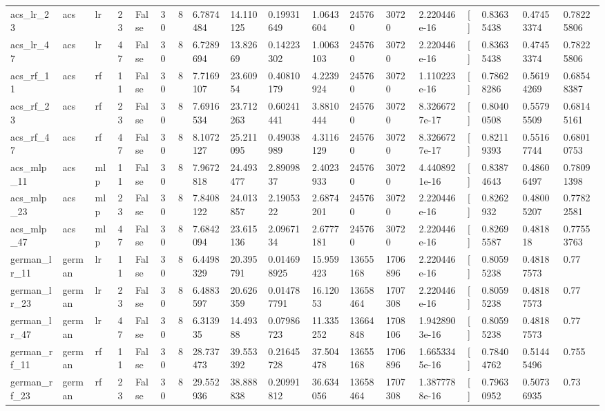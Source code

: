 \begin{tabular}{llllllllllllllllll}
acs\_lr\_23 & acs & lr & 23 & False & 30 & 8 & 6.7874484 & 14.110125 & 0.19931649 & 1.0643604 & 245760 & 30720 & 2.220446e-16 & [] & 0.83635438 & 0.47453374 & 0.78225806 \\
acs\_lr\_47 & acs & lr & 47 & False & 30 & 8 & 6.7289694 & 13.82669 & 0.14223302 & 1.0063103 & 245760 & 30720 & 2.220446e-16 & [] & 0.83635438 & 0.47453374 & 0.78225806 \\
acs\_rf\_11 & acs & rf & 11 & False & 30 & 8 & 7.7169107 & 23.60954 & 0.40810179 & 4.2239924 & 245760 & 30720 & 1.110223e-16 & [] & 0.78628286 & 0.56194269 & 0.68548387 \\
acs\_rf\_23 & acs & rf & 23 & False & 30 & 8 & 7.6916534 & 23.712263 & 0.60241441 & 3.8810444 & 245760 & 30720 & 8.3266727e-17 & [] & 0.80400508 & 0.55795509 & 0.68145161 \\
acs\_rf\_47 & acs & rf & 47 & False & 30 & 8 & 8.1072127 & 25.211095 & 0.49038989 & 4.3116129 & 245760 & 30720 & 8.3266727e-17 & [] & 0.82119393 & 0.55167744 & 0.68010753 \\
acs\_mlp\_11 & acs & mlp & 11 & False & 30 & 8 & 7.9672818 & 24.493477 & 2.8909837 & 2.4023933 & 245760 & 30720 & 4.4408921e-16 & [] & 0.83874643 & 0.48606497 & 0.78091398 \\
acs\_mlp\_23 & acs & mlp & 23 & False & 30 & 8 & 7.8408122 & 24.013857 & 2.1905322 & 2.6874201 & 245760 & 30720 & 2.220446e-16 & [] & 0.8262932 & 0.48005207 & 0.77822581 \\
acs\_mlp\_47 & acs & mlp & 47 & False & 30 & 8 & 7.6842094 & 23.615136 & 2.0967134 & 2.6777181 & 245760 & 30720 & 2.220446e-16 & [] & 0.82695587 & 0.481818 & 0.77553763 \\
german\_lr\_11 & german & lr & 11 & False & 30 & 8 & 6.4498329 & 20.395791 & 0.014698925 & 15.959423 & 13655168 & 1706896 & 2.220446e-16 & [] & 0.80595238 & 0.48187573 & 0.77 \\
german\_lr\_23 & german & lr & 23 & False & 30 & 8 & 6.4883597 & 20.626359 & 0.014787791 & 16.12053 & 13658464 & 1707308 & 2.220446e-16 & [] & 0.80595238 & 0.48187573 & 0.77 \\
german\_lr\_47 & german & lr & 47 & False & 30 & 8 & 6.313935 & 14.49388 & 0.07986723 & 11.335252 & 13664848 & 1708106 & 1.9428903e-16 & [] & 0.80595238 & 0.48187573 & 0.77 \\
german\_rf\_11 & german & rf & 11 & False & 30 & 8 & 28.737473 & 39.553392 & 0.21645728 & 37.504478 & 13655168 & 1706896 & 1.6653345e-16 & [] & 0.78404762 & 0.51445496 & 0.755 \\
german\_rf\_23 & german & rf & 23 & False & 30 & 8 & 29.552936 & 38.888838 & 0.20991812 & 36.634056 & 13658464 & 1707308 & 1.3877788e-16 & [] & 0.79630952 & 0.50736935 & 0.73 \\

\end{tabular}
